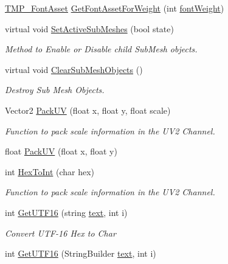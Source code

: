 \begin{DoxyCompactItemize}
\mbox{\hyperlink{class_t_m_pro_1_1_t_m_p___font_asset}{T\+M\+P\+\_\+\+Font\+Asset}} \mbox{\hyperlink{class_t_m_pro_1_1_t_m_p___text_a473e6fb93717c196a1d7d3c4670557a2}{Get\+Font\+Asset\+For\+Weight}} (int \mbox{\hyperlink{class_t_m_pro_1_1_t_m_p___text_a571c8cac097b25de7c9cea8da1c27d47}{font\+Weight}})
\item 
virtual void \mbox{\hyperlink{class_t_m_pro_1_1_t_m_p___text_a83493a2f045f78defb9e86c92d1b3792}{Set\+Active\+Sub\+Meshes}} (bool state)
\begin{DoxyCompactList}\small\item\em Method to Enable or Disable child Sub\+Mesh objects. \end{DoxyCompactList}\item 
virtual void \mbox{\hyperlink{class_t_m_pro_1_1_t_m_p___text_a837eac6133a6ef0cdceb26db59c6ac19}{Clear\+Sub\+Mesh\+Objects}} ()
\begin{DoxyCompactList}\small\item\em Destroy Sub Mesh Objects. \end{DoxyCompactList}\item 
Vector2 \mbox{\hyperlink{class_t_m_pro_1_1_t_m_p___text_ab3678ea5e10c2193b87d1ee79f8ef5c3}{Pack\+UV}} (float x, float y, float scale)
\begin{DoxyCompactList}\small\item\em Function to pack scale information in the U\+V2 Channel. \end{DoxyCompactList}\item 
float \mbox{\hyperlink{class_t_m_pro_1_1_t_m_p___text_adff52c0fb7ca30e42a9a9c6eb4799c15}{Pack\+UV}} (float x, float y)
\item 
int \mbox{\hyperlink{class_t_m_pro_1_1_t_m_p___text_a2c888ce3a21999d51131753730cac678}{Hex\+To\+Int}} (char hex)
\begin{DoxyCompactList}\small\item\em Function to pack scale information in the U\+V2 Channel. \end{DoxyCompactList}\item 
int \mbox{\hyperlink{class_t_m_pro_1_1_t_m_p___text_ac300ce0327de1c0807c6617496b367cb}{Get\+U\+T\+F16}} (string \mbox{\hyperlink{class_t_m_pro_1_1_t_m_p___text_a98a04e5078612c0586472bd510f91f5c}{text}}, int i)
\begin{DoxyCompactList}\small\item\em Convert U\+T\+F-\/16 Hex to Char \end{DoxyCompactList}\item 
int \mbox{\hyperlink{class_t_m_pro_1_1_t_m_p___text_a0cfc7cb7ac6ce49e764d26bc9c3ffcee}{Get\+U\+T\+F16}} (String\+Builder \mbox{\hyperlink{class_t_m_pro_1_1_t_m_p___text_a98a04e5078612c0586472bd510f91f5c}{text}}, int i)

\end{DoxyCompactItemize}
